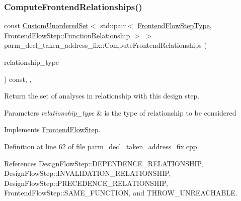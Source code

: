\subsubsection{\texorpdfstring{Compute\+Frontend\+Relationships()}{ComputeFrontendRelationships()}}
{\footnotesize\ttfamily const \hyperlink{classCustomUnorderedSet}{Custom\+Unordered\+Set}$<$ std\+::pair$<$ \hyperlink{frontend__flow__step_8hpp_afeb3716c693d2b2e4ed3e6d04c3b63bb}{Frontend\+Flow\+Step\+Type}, \hyperlink{classFrontendFlowStep_af7cf30f2023e5b99e637dc2058289ab0}{Frontend\+Flow\+Step\+::\+Function\+Relationship} $>$ $>$ parm\+\_\+decl\+\_\+taken\+\_\+address\+\_\+fix\+::\+Compute\+Frontend\+Relationships (\begin{DoxyParamCaption}\item[{const \hyperlink{classDesignFlowStep_a723a3baf19ff2ceb77bc13e099d0b1b7}{Design\+Flow\+Step\+::\+Relationship\+Type}}]{relationship\+\_\+type }\end{DoxyParamCaption}) const\hspace{0.3cm}{\ttfamily [override]}, {\ttfamily [protected]}, {\ttfamily [virtual]}}



Return the set of analyses in relationship with this design step. 


\begin{DoxyParams}{Parameters}
{\em relationship\+\_\+type} & is the type of relationship to be considered \\
\hline
\end{DoxyParams}


Implements \hyperlink{classFrontendFlowStep_abeaff70b59734e462d347ed343dd700d}{Frontend\+Flow\+Step}.



Definition at line 62 of file parm\+\_\+decl\+\_\+taken\+\_\+address\+\_\+fix.\+cpp.



References Design\+Flow\+Step\+::\+D\+E\+P\+E\+N\+D\+E\+N\+C\+E\+\_\+\+R\+E\+L\+A\+T\+I\+O\+N\+S\+H\+IP, Design\+Flow\+Step\+::\+I\+N\+V\+A\+L\+I\+D\+A\+T\+I\+O\+N\+\_\+\+R\+E\+L\+A\+T\+I\+O\+N\+S\+H\+IP, Design\+Flow\+Step\+::\+P\+R\+E\+C\+E\+D\+E\+N\+C\+E\+\_\+\+R\+E\+L\+A\+T\+I\+O\+N\+S\+H\+IP, Frontend\+Flow\+Step\+::\+S\+A\+M\+E\+\_\+\+F\+U\+N\+C\+T\+I\+ON, and T\+H\+R\+O\+W\+\_\+\+U\+N\+R\+E\+A\+C\+H\+A\+B\+LE.

\mbox{\label{classparm__decl__taken__address__fix_afeaf66df2e6c884ca04ae5410298d052}} 
